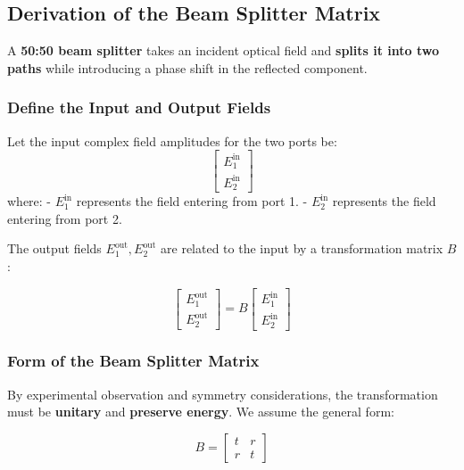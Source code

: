 \documentclass[a4paper,12pt]{article}
\begin{document}
\subsection{\textbf{Derivation of the Beam Splitter Matrix}}
A \textbf{50:50 beam splitter} takes an incident optical field and \textbf{splits it into two paths} while introducing a phase shift in the reflected component. 

\subsubsection{\textbf{Define the Input and Output Fields}}
Let the input complex field amplitudes for the two ports be:
\begin{equation}
    \begin{bmatrix} E_1^{\text{in}} \\ E_2^{\text{in}} \end{bmatrix}
\end{equation}
where:
- \( E_1^{\text{in}} \) represents the field entering from port 1.
- \( E_2^{\text{in}} \) represents the field entering from port 2.

The output fields \( E_1^{\text{out}}, E_2^{\text{out}} \) are related to the input by a transformation matrix \( B \):

\begin{equation}
    \begin{bmatrix} E_1^{\text{out}} \\ E_2^{\text{out}} \end{bmatrix} = B \begin{bmatrix} E_1^{\text{in}} \\ E_2^{\text{in}} \end{bmatrix}
\end{equation}

\subsubsection{\textbf{Form of the Beam Splitter Matrix}}
By experimental observation and symmetry considerations, the transformation must be \textbf{unitary} and \textbf{preserve energy}. We assume the general form:

\begin{equation}
B =
\begin{bmatrix}
    t & r \\
    r & t
\end{bmatrix}
\end{equation}
\end{document}
